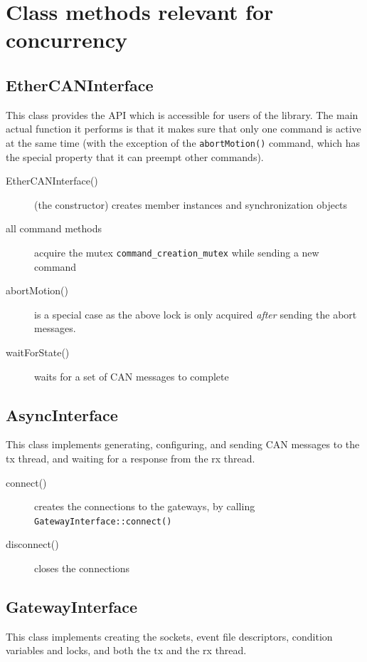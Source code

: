 \documentclass[fontsize=12,a4paper]{scrartcl}
\begin{document}
\appendix

\section{Class methods relevant for concurrency}

\subsection{EtherCANInterface}

This class provides the API which is accessible for
users of the library. The main actual function it
performs is that it makes sure that only one
command is active at the same time (with the exception of
the \texttt{abortMotion()} command, which has the special
property that it can preempt other commands).

\begin{description}
\item[EtherCANInterface()] (the constructor) creates member instances
  and synchronization objects
\item[all command methods] acquire the mutex \texttt{command\_creation\_mutex}
  while sending a new command
\item[abortMotion()] is a special case as the above lock is only acquired \emph{after} sending the
  abort messages.
  \item[waitForState()] waits for a set of CAN messages to complete
\end{description}

\subsection{AsyncInterface}

This class implements generating, configuring, and
sending CAN messages to the tx thread, and waiting
for a response from the rx thread.

\begin{description}
  \item[connect()] creates the connections to the gateways, by calling \texttt{GatewayInterface::connect()}
  \item[disconnect()] closes the connections
\end{description}


\subsection{GatewayInterface}
This class implements creating the sockets, event file descriptors,
condition variables and locks, and both the tx and the rx thread.
\end{document}
